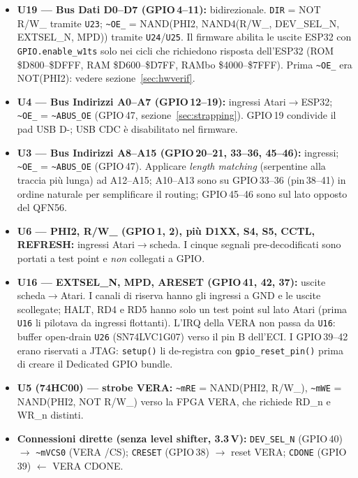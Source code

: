 \documentclass[12pt, a4paper]{article}
\begin{document}
\begin{itemize}
    \item {\bfseries U19 — Bus Dati D0--D7 (GPIO\,4--11):} bidirezionale. \texttt{DIR} = NOT R/W\_ tramite \texttt{U23}; \texttt{\textasciitilde OE\_} = NAND(PHI2, NAND4(R/W\_, DEV\_SEL\_N, EXTSEL\_N, MPD)) tramite \texttt{U24}/\texttt{U25}. Il firmware abilita le uscite ESP32 con \texttt{GPIO.enable\_w1ts} solo nei cicli che richiedono risposta dell'ESP32 (ROM \$D800--\$DFFF, RAM \$D600--\$D7FF, RAMbo \$4000--\$7FFF). Prima \texttt{\textasciitilde OE\_} era NOT(PHI2): vedere sezione~\ref{sec:hwverif}.
    \item {\bfseries U4 — Bus Indirizzi A0--A7 (GPIO\,12--19):} ingressi Atari$\rightarrow$ESP32; \texttt{\textasciitilde OE\_} = \texttt{\textasciitilde ABUS\_OE} (GPIO\,47, sezione~\ref{sec:strapping}). GPIO\,19 condivide il pad USB D-; USB CDC è disabilitato nel firmware.
    \item {\bfseries U3 — Bus Indirizzi A8--A15 (GPIO\,20--21, 33--36, 45--46):} ingressi; \texttt{\textasciitilde OE\_} = \texttt{\textasciitilde ABUS\_OE} (GPIO\,47). Applicare \emph{length matching} (serpentine alla traccia più lunga) ad A12--A15; A10--A13 sono su GPIO\,33--36 (pin\,38--41) in ordine naturale per semplificare il routing; GPIO\,45--46 sono sul lato opposto del QFN56.
    \item {\bfseries U6 — PHI2, R/W\_ (GPIO\,1, 2), più D1XX, S4, S5, CCTL, REFRESH:} ingressi Atari$\rightarrow$scheda. I cinque segnali pre-decodificati sono portati a test point e \emph{non} collegati a GPIO.
    \item {\bfseries U16 — EXTSEL\_N, MPD, ARESET (GPIO\,41, 42, 37):} uscite scheda$\rightarrow$Atari. I canali di riserva hanno gli ingressi a GND e le uscite scollegate; HALT, RD4 e RD5 hanno solo un test point sul lato Atari (prima \texttt{U16} li pilotava da ingressi flottanti). L'IRQ della VERA non passa da \texttt{U16}: buffer open-drain \texttt{U26} (SN74LVC1G07) verso il pin B dell'ECI. I GPIO\,39--42 erano riservati a JTAG: \texttt{setup()} li de-registra con \texttt{gpio\_reset\_pin()} prima di creare il Dedicated GPIO bundle.
    \item {\bfseries U5 (74HC00) — strobe VERA:} \texttt{\textasciitilde mRE} = NAND(PHI2, R/W\_), \texttt{\textasciitilde mWE} = NAND(PHI2, NOT R/W\_) verso la FPGA VERA, che richiede RD\_n e WR\_n distinti.
    \item {\bfseries Connessioni dirette (senza level shifter, 3.3\,V):} \texttt{DEV\_SEL\_N} (GPIO\,40) $\rightarrow$ \texttt{\textasciitilde mVCS0} (VERA /CS); \texttt{CRESET} (GPIO\,38) $\rightarrow$ reset VERA; \texttt{CDONE} (GPIO\,39) $\leftarrow$ VERA CDONE.
\end{itemize}
\end{document}
